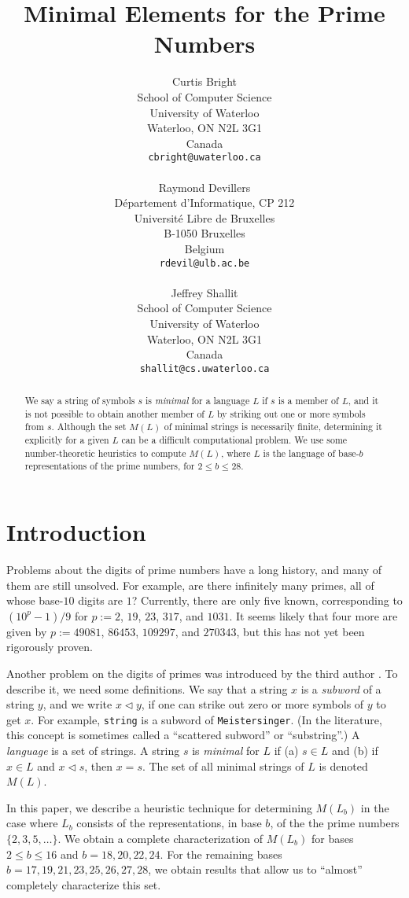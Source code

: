 \documentclass[12pt]{article}
\title{Minimal Elements for the Prime Numbers}
\author{Curtis Bright\\
School of Computer Science\\
University of Waterloo\\
Waterloo, ON  N2L 3G1\\
Canada\\
{\tt cbright@uwaterloo.ca} \\
\ \\
Raymond Devillers\\
D\'epartement d'Informatique, CP 212\\
Universit\'e Libre de Bruxelles \\
B-1050 Bruxelles\\
Belgium\\
{\tt rdevil@ulb.ac.be} \\
\ \\
Jeffrey Shallit \\
School of Computer Science\\
University of Waterloo\\
Waterloo, ON  N2L 3G1\\
Canada \\
{\tt shallit@cs.uwaterloo.ca}}
\def\subw{\mathrel{\triangleleft}}
\theoremstyle{plain}
\theoremstyle{definition}
\theoremstyle{remark}
\newcommand{\0}{\mathtt{0}}
\newcommand{\1}{\mathtt{1}}
\newcommand{\2}{\mathtt{2}}
\newcommand{\3}{\mathtt{3}}
\newcommand{\4}{\mathtt{4}}
\newcommand{\5}{\mathtt{5}}
\newcommand{\6}{\mathtt{6}}
\newcommand{\7}{\mathtt{7}}
\newcommand{\8}{\mathtt{8}}
\newcommand{\9}{\mathtt{9}}
\begin{document}
\maketitle

\begin{abstract}
We say a string of symbols $s$ is {\it minimal} for a language $L$
if $s$ is a member of $L$, and it is not possible to obtain another 
member of $L$ by striking out one or more symbols from $s$.  Although
the set $M(L)$ of minimal strings is necessarily finite, determining
it explicitly for a given $L$ can be a difficult computational problem.  
We use some number-theoretic heuristics to compute $M(L)$, where $L$
is the language of base-$b$ representations of the prime numbers,
for $2 \leq b \leq 28$.
\end{abstract}

\section{Introduction}

Problems about the digits of prime numbers have a long history, and many
of them are still unsolved.  For example, are there infinitely many
primes, all of whose base-$10$ digits are $1$?  Currently,
there are only five
known, corresponding to $(10^p-1)/9$ for $p := 2$, $19$, $23$, $317$, and
$1031$.  It seems likely that four more are given by
$p := 49081$, $86453$, $109297$, and $270343$, but this has not yet been
rigorously proven.

Another problem on the digits of primes was introduced by the
third author \cite{Sh00}.  To describe it, we need some definitions.
We say that a string $x$ is a {\it subword} of a string $y$, and 
we write $x \subw y$, if 
one can strike out zero or more symbols of $y$ to get $x$.
For example, {\tt string} is a subword of
{\tt Meistersinger}.  
(In the literature, this concept is sometimes called a ``scattered
subword'' or ``substring''.)
A {\it language} is a set of strings.  A string $s$ is {\it minimal}
for $L$ if  (a) $s \in L$ and (b) if $x \in L$ and $x \subw s$, then
$x = s$.    The set of all minimal strings of $L$ is denoted $M(L)$.

In this paper, we describe a heuristic
technique for determining $M(L_b)$ in the
case where $L_b$ consists of the representations, in base $b$, of the
the prime numbers $\lbrace 2, 3, 5, \dotsc \rbrace$.  We obtain
a complete characterization of $M(L_b)$ for bases
$2 \leq b \leq 16$ and $b = 18,20,22,24$.   For the remaining
bases $b = 17,19,21,23,25,26,27,28$,
we obtain
results that allow us to ``almost'' completely characterize this set.
\end{document}
